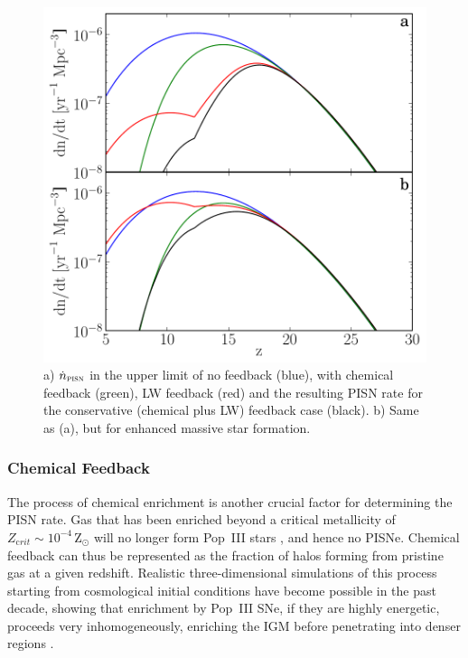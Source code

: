 \documentclass{thesis}
\newcommand{\zsun}{\ensuremath{\,\mathrm{Z}_{\odot}}\xspace}
\begin{document}
\begin{figure}
 \begin{center}
   \includegraphics[width=\columnwidth]{feedbackRate}
   \caption{a) $\dot{n}_{\textsc{pisn}}$ in the upper limit of no
     feedback (blue), with chemical feedback (green), LW feedback
     (red) and the resulting PISN rate for the conservative (chemical
     plus LW) feedback case (black).  b) Same as (a), but for enhanced
     massive star formation.}
   \label{fbrate}
 \end{center}
\end{figure}


\subsubsection{Chemical Feedback}
The process of chemical enrichment is another crucial factor for
determining the PISN rate.  Gas that has been enriched beyond a
critical metallicity of $Z_{\mathrm crit} \sim 10^{-4}$\zsun will
no longer form Pop~III stars \citep{BrommKudritzkiLoeb2001,
  Schneideretal2002, BrommLoeb2003}, and hence no PISNe.  Chemical
feedback can thus be represented as the fraction of halos forming from
pristine gas at a given redshift.  Realistic three-dimensional
simulations of this process starting from cosmological initial
conditions have become possible in the past decade, showing that
enrichment by Pop~III SNe, if they are highly energetic, proceeds very
inhomogeneously, enriching the IGM before penetrating into denser
regions \citep{Scannapiecoetal2005, Greifetal2007,
  TornatoreFerraraSchneider2007,WiseAbel2008, Maioetal2010}.
\end{document}

